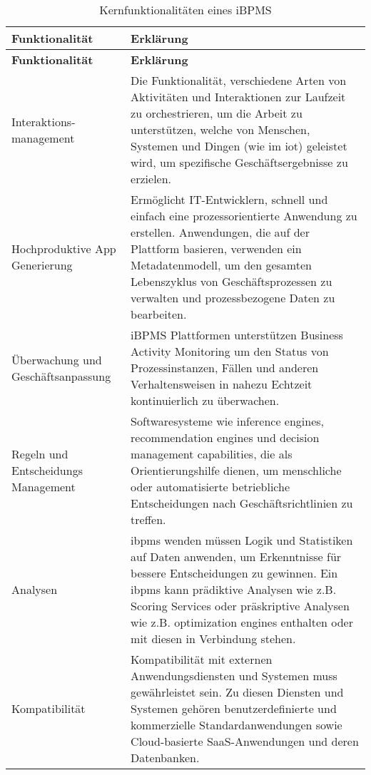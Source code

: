  \begin{longtable}{P{4cm}|X}
  \caption{Kernfunktionalitäten eines iBPMS \cite{ibpms}}\\
  \label{table:GartnerIBPMS}
  \textbf{Funktionalität} & \textbf{Erklärung}  \\ \hline
  \endfirsthead %
  \textbf{Funktionalität} & \textbf{Erklärung}  \\ \hline
  \endhead %
  Interaktions-management & Die Funktionalität, verschiedene Arten von Aktivitäten und Interaktionen zur Laufzeit zu orchestrieren, um die Arbeit zu unterstützen, welche von Menschen, Systemen und Dingen (wie im \ac{iot}) geleistet wird, um spezifische Geschäftsergebnisse zu erzielen.\\ \hline
  Hochproduktive App Generierung & Ermöglicht IT-Entwicklern, schnell und einfach eine prozessorientierte Anwendung zu erstellen.
  Anwendungen, die auf der Plattform basieren, verwenden ein Metadatenmodell, um den gesamten Lebenszyklus von Geschäftsprozessen zu verwalten und prozessbezogene Daten zu bearbeiten.\\ \hline
  Überwachung und Geschäftsanpassung & iBPMS Plattformen unterstützen Business Activity Monitoring um den Status von Prozessinstanzen, Fällen und anderen Verhaltensweisen in nahezu Echtzeit kontinuierlich zu überwachen.\\ \hline
  Regeln und Entscheidungs Management &  Softwaresysteme wie inference engines, recommendation engines und decision management capabilities, die als Orientierungshilfe dienen, um menschliche oder automatisierte betriebliche Entscheidungen nach Geschäftsrichtlinien zu treffen.\\ \hline
  Analysen & \ac{ibpms} wenden müssen Logik und Statistiken auf Daten anwenden, um Erkenntnisse für bessere Entscheidungen zu gewinnen. Ein \ac{ibpms} kann prädiktive Analysen wie z.B. Scoring Services oder präskriptive Analysen wie z.B. optimization engines enthalten oder mit diesen in Verbindung stehen.\\ \hline
  Kompatibilität &  Kompatibilität mit externen Anwendungsdiensten und Systemen muss gewährleistet sein. Zu diesen Diensten und Systemen gehören benutzerdefinierte und kommerzielle Standardanwendungen sowie Cloud-basierte SaaS-Anwendungen und deren Datenbanken.\\ \hline

\end{longtable}
